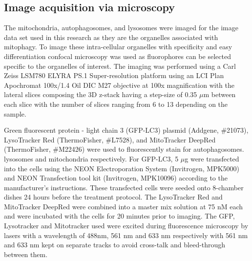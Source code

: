 \subsection{Image acquisition via microscopy}
The mitochondria, autophagosomes, and lysosomes were imaged for the image data set used in this research as they are the organelles associated with mitophagy. To image these intra-cellular organelles with specificity and easy differentiation confocal microscopy was used as fluorophores can be selected specific to the organelles of interest. The imaging was performed using a Carl Zeiss LSM780 ELYRA PS.1 Super-resolution platform using an LCI Plan Apochromat 100x/1.4 Oil DIC M27 objective at 100x magnification with the lateral slices composing the 3D z-stack having a step-size of 0.35 $\mu$m between each slice with the number of slices ranging from 6 to 13 depending on the sample.\par 
Green fluorescent protein - light chain 3 (GFP-LC3) plasmid (Addgene, \#21073), LysoTracker Red (ThermoFisher, \#L7528), and MitoTracker DeepRed (ThermoFisher, \#M22426) were used to fluorescently stain for autophagosomes. lysosomes and mitochondria respectively. For GFP-LC3, 5 $\mu$g were transfected into the cells using the NEON Electroporation System (Invitrogen, MPK5000) and NEON Transfection tool kit (Invitrogen, MPK10096) according to the manufacturer's instructions. These transfected cells were seeded onto 8-chamber dishes 24 hours before the treatment protocol. The LysoTracker Red and MitoTracker DeepRed were combined into a master mix solution at 75 nM each and were incubated with the cells for 20 minutes prior to imaging. The GFP, Lysotracker and Mitotracker used were excited during fluorescence microscopy by lasers with a wavelength of 488nm, 561 nm and 633 nm respectively with 561 nm and 633 nm kept on separate tracks to avoid cross-talk and bleed-through between them. 

